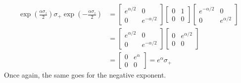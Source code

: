 \documentclass[../../../main.tex]{subfiles}
\begin{document}
\begin{align*}
    \exp \left( \frac{\alpha \sigma_z}{2} \right)  \sigma_+ \exp \left(- \frac{\alpha \sigma_z}{2} \right)
     & =
    \begin{bmatrix}
        e^{\alpha/2} & 0             \\
        0            & e^{-\alpha/2}
    \end{bmatrix}
    \begin{bmatrix}
        0 & 1 \\
        0 & 0
    \end{bmatrix}
    \begin{bmatrix}
        e^{-\alpha/2} & 0            \\
        0             & e^{\alpha/2}
    \end{bmatrix} \\
     & =
    \begin{bmatrix}
        e^{\alpha/2} & 0             \\
        0            & e^{-\alpha/2}
    \end{bmatrix}
    \begin{bmatrix}
        0 & e^{\alpha/2} \\
        0 & 0
    \end{bmatrix}             \\
     & = \begin{bmatrix}
             0 & e^{\alpha} \\
             0 & 0
         \end{bmatrix}
    = e^{\alpha} \sigma_+
\end{align*}
Once again, the same goes for the negative exponent.
\end{document}
